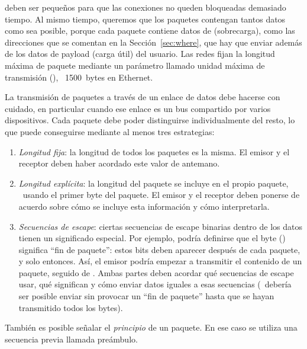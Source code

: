  deben ser pequeños para que las conexiones no queden bloqueadas demasiado tiempo. 
Al mismo tiempo, queremos que los paquetes contengan tantos datos como sea posible, porque cada paquete 
contiene datos de  (sobrecarga), como las direcciones que se comentan en la Sección~\ref{sec:where}, que hay
que enviar además de los datos de payload (carga útil) del usuario. Las redes fijan la longitud máxima de paquete
mediante un parámetro llamado unidad máxima de transmisión (), \eg\ 1500~bytes en Ethernet.


La transmisión de paquetes a través de un enlace de datos debe hacerse con cuidado,
en particular cuando ese enlace es un bus compartido por varios dispositivos.
Cada paquete debe poder distinguirse individualmente del resto, 
lo que puede conseguirse mediante al menos tres estrategias:
\begin{enumerate}
\item \textit{Longitud fija}: la longitud de todos los paquetes es la misma. El emisor y el receptor deben haber
acordado este valor de antemano.

\item \textit{Longitud explícita}: la longitud del paquete se incluye en el propio paquete, \eg\ 
usando el primer byte del paquete. El emisor y el receptor deben ponerse de acuerdo sobre cómo se incluye
esta información y cómo interpretarla.

\item \textit{Secuencias de escape}: ciertas secuencias de escape binarias 
dentro de los datos tienen un significado especial. 
Por ejemplo, podría definirse que el byte  () 
significa ``fin de paquete'': estos bits deben aparecer después de cada paquete, y solo entonces.
% 
Así, el emisor podría empezar a transmitir el contenido de un paquete, seguido de .
Ambas partes deben acordar qué secuencias de escape usar, qué significan y cómo 
enviar datos iguales a esas secuencias (\eg\ debería ser posible enviar 
sin provocar un ``fin de paquete'' hasta que se hayan transmitido todos los bytes).
\end{enumerate}

\begin{remark}
También es posible señalar el \textit{principio} de un paquete. En ese caso se utiliza una secuencia previa llamada preámbulo.
\end{remark}


